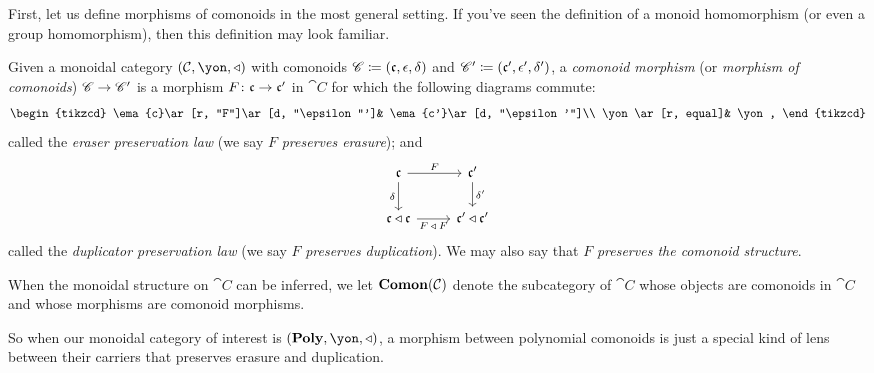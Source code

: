 \documentclass[Book-Poly]{subfiles}
\begin{document}
First, let us define morphisms of comonoids in the most general setting.
If you've seen the definition of a monoid homomorphism (or even a group homomorphism), then this definition may look familiar.

\begin{definition}\label{def.morphism_comonoids}
Given a monoidal category $(\cat{C},\yon,\tri)$ with comonoids $\mathscr{C}\coloneqq(\mathfrak{c},\epsilon,\delta)$ and $\mathscr{C}'\coloneqq(\mathfrak{c'},\epsilon',\delta')$, a \emph{comonoid morphism} (or \emph{morphism of comonoids}) $\mathscr{C}\to\mathscr{C}'$ is a morphism $F\colon \mathfrak{c}\to\mathfrak{c'}$ in $\cat{C}$ for which the following diagrams commute:
\begin{equation}\label{eqn.pres_era}
\begin{tikzcd}
    \ema{c}\ar[r, "F"]\ar[d, "\epsilon"']&
    \ema{c'}\ar[d, "\epsilon'"]\\
    \yon\ar[r, equal]&
    \yon,
\end{tikzcd}
\end{equation}
called the \emph{eraser preservation law} (we say $F$ \emph{preserves erasure}); and
\begin{equation}\label{eqn.pres_dup}
\begin{tikzcd}
    \ema{c}\ar[r, "F"]\ar[d, "\delta"']&
    \ema{c'}\ar[d, "\delta'"]\\
    \ema{c}\tri\ema{c}\ar[r, "F\:\tri\:F"']&
    \ema{c'}\tri\ema{c'}
\end{tikzcd}
\end{equation}
called the \emph{duplicator preservation law} (we say $F$ \emph{preserves duplication}).
We may also say that $F$ \emph{preserves the comonoid structure}.

When the monoidal structure on $\cat{C}$ can be inferred, we let $\mathbf{Comon}(\mathcal{C})$ denote the subcategory of $\cat{C}$ whose objects are comonoids in $\cat{C}$ and whose morphisms are comonoid morphisms.
\end{definition}

So when our monoidal category of interest is $(\poly,\yon,\tri)$, a morphism between polynomial comonoids is just a special kind of lens between their carriers that preserves erasure and duplication.
\end{document}

